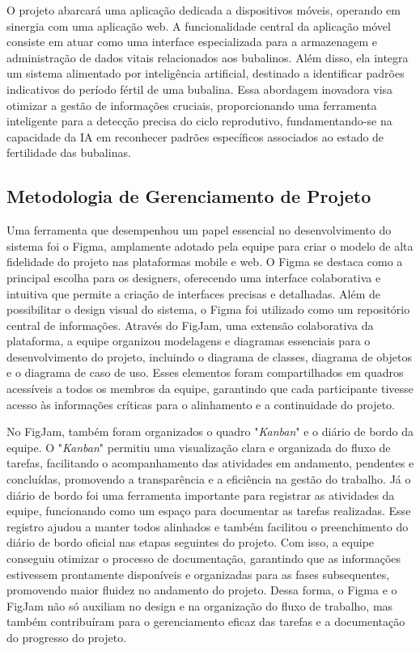 O projeto abarcará uma aplicação dedicada a dispositivos móveis, operando em sinergia com uma aplicação web. A funcionalidade central da aplicação móvel consiste em atuar como uma interface especializada para a armazenagem e administração de dados vitais relacionados aos bubalinos. Além disso, ela integra um sistema alimentado por inteligência artificial, destinado a identificar padrões indicativos do período fértil de uma bubalina. Essa abordagem inovadora visa otimizar a gestão de informações cruciais, proporcionando uma ferramenta inteligente para a detecção precisa do ciclo reprodutivo, fundamentando-se na capacidade da IA em reconhecer padrões específicos associados ao estado de fertilidade das bubalinas.

\subsection*{Metodologia de Gerenciamento de Projeto}

Uma ferramenta que desempenhou um papel essencial no desenvolvimento do sistema foi o Figma, amplamente adotado pela equipe para criar o modelo de alta fidelidade do projeto nas plataformas mobile e web. O Figma se destaca como a principal escolha para os designers, oferecendo uma interface colaborativa e intuitiva que permite a criação de interfaces precisas e detalhadas. Além de possibilitar o design visual do sistema, o Figma foi utilizado como um repositório central de informações. Através do FigJam, uma extensão colaborativa da plataforma, a equipe organizou modelagens e diagramas essenciais para o desenvolvimento do projeto, incluindo o diagrama de classes, diagrama de objetos e o diagrama de caso de uso. Esses elementos foram compartilhados em quadros acessíveis a todos os membros da equipe, garantindo que cada participante tivesse acesso às informações críticas para o alinhamento e a continuidade do projeto.

No FigJam, também foram organizados o quadro "\textit{Kanban}" e o diário de bordo da equipe. O "\textit{Kanban}" permitiu uma visualização clara e organizada do fluxo de tarefas, facilitando o acompanhamento das atividades em andamento, pendentes e concluídas, promovendo a transparência e a eficiência na gestão do trabalho. Já o diário de bordo foi uma ferramenta importante para registrar as atividades da equipe, funcionando como um espaço para documentar as tarefas realizadas. Esse registro ajudou a manter todos alinhados e também facilitou o preenchimento do diário de bordo oficial nas etapas seguintes do projeto. Com isso, a equipe conseguiu otimizar o processo de documentação, garantindo que as informações estivessem prontamente disponíveis e organizadas para as fases subsequentes, promovendo maior fluidez no andamento do projeto. Dessa forma, o Figma e o FigJam não só auxiliam no design e na organização do fluxo de trabalho, mas também contribuíram para o gerenciamento eficaz das tarefas e a documentação do progresso do projeto.

